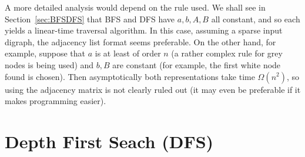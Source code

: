 A more detailed analysis would depend on the rule used. We shall see
in Section~\ref{sec:BFSDFS} that BFS and DFS have $a, b, A, B$ all
constant, and so each yields a linear-time traversal algorithm. In this
case, assuming a sparse input digraph, the adjacency list format seems
preferable. On the other hand, for example, suppose that $a$ is at least
of order $n$ (a rather complex rule for grey nodes is being used) and $b,
B$ are constant (for example, the first white node found is chosen). Then
asymptotically both representations take time $\Omega(n^2)$, so using
the adjacency matrix is not clearly ruled out (it may even be preferable
if it makes programming easier).

%
%
%

\chapter{Depth First Seach (DFS)}

